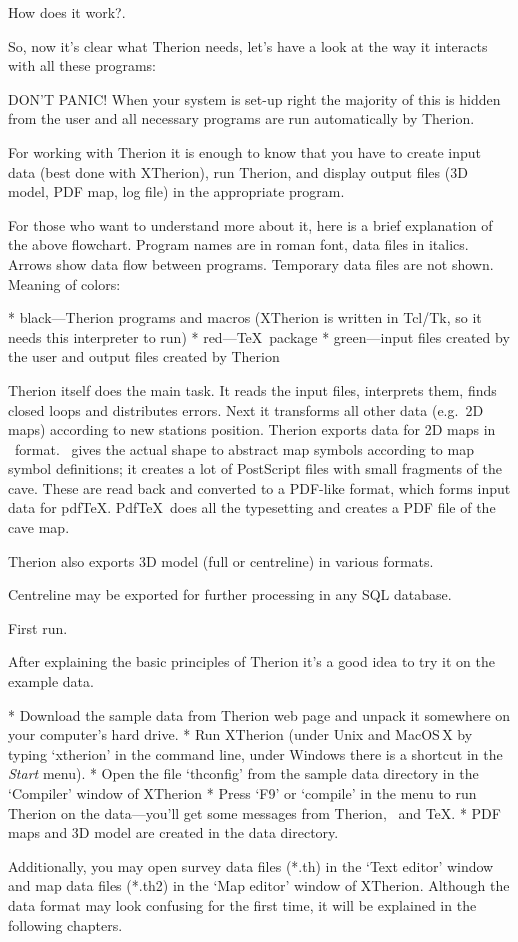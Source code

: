 \subchapter How does it work?.

So, now it's clear what Therion needs, let's have a look at the way 
it interacts with all these programs:


DON'T PANIC! When your system is set-up right the majority of this is hidden from 
the user and all necessary programs are run automatically by Therion. 

For working with Therion it is enough to know that you have to create input data 
(best done with XTherion), run Therion, and display output files 
(3D model, PDF map, log file) in the appropriate program. 

For those who want to understand more about it, here is a brief explanation of 
the above flowchart. Program names are in roman font, data files in italics. 
Arrows show data flow between programs. Temporary data files are not shown. 
Meaning of colors:

\list
* black---Therion programs and macros (XTherion is written in Tcl/Tk,
  so it needs this interpreter to run)
* red---\TeX\ package
* green---input files created by the user and output files created by Therion
\endlist

Therion itself does the main task. It reads the input files, interprets them, 
finds closed loops and distributes errors. Next it transforms all other data 
(e.g.~2D maps) according to new stations position.
Therion exports data for 2D maps in \MP\ format. \MP\ gives 
the actual shape to abstract map symbols according to map symbol definitions; it
creates a lot of PostScript files with small fragments of the cave. These are 
read back and converted to a PDF-like format, which forms input data 
for pdf\TeX. Pdf\TeX\ does all the typesetting and creates a PDF file of the cave 
map. 

Therion also exports 3D model (full or centreline) in various formats.

Centreline may be exported for further processing in any SQL database.


\subchapter First run.

After explaining the basic principles of Therion it's a good idea to try it
on the example data.

\list
* Download the sample data from Therion web page and unpack it somewhere on
  your computer's hard drive.
* Run XTherion (under Unix and MacOS\,X by typing `xtherion' in the command 
  line, under Windows there is a shortcut in the {\it Start} menu).
* Open the file `thconfig' from the sample data directory in the `Compiler'
  window of XTherion
* Press `F9' or `compile' in the menu to run Therion on the data---you'll get
  some messages from Therion, \MP\ and \TeX.  
* PDF maps and 3D model are created in the data directory.  
\endlist

Additionally, you may open survey data files (*.th) in the `Text editor' window 
and map data files (*.th2) in the `Map editor' window of XTherion. Although the 
data format may look confusing for the first time, it will be explained in the 
following chapters.

\endinput
